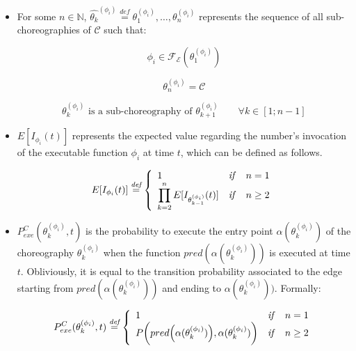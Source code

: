 \documentclass[12pt,a4paper]{report}
\newcommand{\mathDef}{\overset{\textit{def}}{=}}
\newcommand{\N}{\mathbb{N}}
\begin{document}
\begin{itemize}
	\item For some $n \in \N$, $\widehat{\theta_k}^{(\phi_i)} \mathDef {\theta^{(\phi_i)}_1, \ldots, \theta^{(\phi_i)}_n}$ represents the sequence of all sub-choreographies of $\mathcal{C}$ such that:
	
	\begin{equation}
		\phi_i \in \mathscr{F_E}(\theta^{(\phi_i)}_1)
	\end{equation}
	
	\begin{equation}
		\theta^{(\phi_i)}_n = \mathcal{C}
	\end{equation}
	
	\begin{equation}
		\theta^{(\phi_i)}_k \text{ is a sub-choreography of } \theta^{(\phi_i)}_{k+1} \qquad \forall k \in \left[1;n-1\right]
	\end{equation}

	\item $E[I_{\phi_i}(t)]$ represents the expected value regarding the number's invocation of the executable function $\phi_i$ at time $t$, which can be defined as follows.
	
	\begin{equation}	
		E[I_{\phi_i}(t)] \mathDef \left\{
		\begin{array}{lcr}
			1 & \text{\textit{if}} & n = 1 \\ 
			\displaystyle \prod_{k = 2}^n E[I_{\theta_{k-1}^{(\phi_i)}}(t)] & \text{\textit{if}} & n \geq 2 \\
		\end{array} \right.
	\end{equation}
	
	\item $P_{exe}^C(\theta^{(\phi_i)}_k, t)$ is the probability to execute the entry point $\alpha(\theta^{(\phi_i)}_k)$ of the choreography $\theta^{(\phi_i)}_k$ when the function $pred(\alpha(\theta^{(\phi_i)}_k))$ is executed at time $t$. Obliviously, it is equal to the transition probability associated to the edge starting from $pred( \alpha(\theta^{(\phi_i)}_{k}) )$ and ending to $\alpha(\theta^{(\phi_i)}_{k}))$. Formally:
	
	\begin{equation}	
		P_{exe}^C(\theta^{(\phi_i)}_k, t) \mathDef \left\{
		\begin{array}{lcr}
			1 & \text{\textit{if}} & n = 1 \\ 
			P \bigg(  pred\Big( \alpha(\theta^{(\phi_i)}_{k}) \Big), \alpha(\theta^{(\phi_i)}_{k}) \bigg) & \text{\textit{if}} & n \geq 2 \\
		\end{array} \right.
	\end{equation}
	

\end{itemize}
\end{document}
